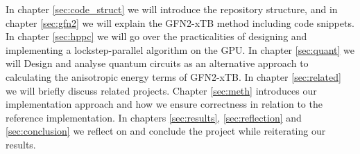 In chapter \ref{sec:code_struct} we will introduce the repository structure, and in chapter \ref{sec:gfn2} we will explain the GFN2-xTB method including code snippets. In chapter \ref{sec:hppc} we will go over the practicalities of designing and implementing a lockstep-parallel algorithm on the GPU. In chapter \ref{sec:quant} we will Design and analyse quantum circuits as an alternative approach to calculating the anisotropic energy terms of GFN2-xTB. In chapter \ref{sec:related} we will briefly discuss related projects. Chapter \ref{sec:meth} introduces our implementation approach and how we ensure correctness in relation to the reference implementation. In chapters \ref{sec:results}, \ref{sec:reflection} and \ref{sec:conclusion} we reflect on and conclude the project while reiterating our results.
